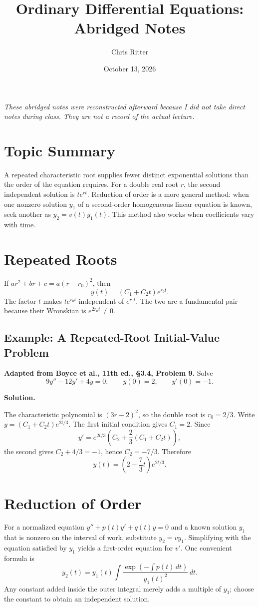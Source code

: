 \documentclass[11pt]{article}
\title{Ordinary Differential Equations: Abridged Notes}
\author{Chris Ritter}
\date{October 13, 2026}
\newenvironment{solution}
    {\par\noindent\textbf{Solution.}\par}
    {\par}
\begin{document}
\maketitle
\begin{center}
\small\emph{These abridged notes were reconstructed afterward because I did not take
direct notes during class. They are not a record of the actual lecture.}
\end{center}
\tableofcontents
\newpage

\section{Topic Summary}
A repeated characteristic root supplies fewer distinct exponential
solutions than the order of the equation requires. For a double real
root \(r\), the second independent solution is \(te^{rt}\).
Reduction of order is a more general method: when one nonzero
solution \(y_1\) of a second-order homogeneous linear equation is
known, seek another as \(y_2=v(t)y_1(t)\). This method also works
when coefficients vary with time.

\section{Repeated Roots}
If \(ar^2+br+c=a(r-r_0)^2\), then
\[
\boxed{y(t)=(C_1+C_2t)e^{r_0t}.}
\]
The factor \(t\) makes \(te^{r_0t}\) independent of
\(e^{r_0t}\). The two are a fundamental pair because their
Wronskian is \(e^{2r_0t}\ne0\).

\subsection{Example: A Repeated-Root Initial-Value Problem}
\textbf{Adapted from Boyce et al., 11th ed., \S3.4, Problem 9.}
Solve
\[
9y''-12y'+4y=0,\qquad y(0)=2,\qquad y'(0)=-1.
\]
\begin{solution}
The characteristic polynomial is \((3r-2)^2\), so the double root
is \(r_0=2/3\). Write \(y=(C_1+C_2t)e^{2t/3}\). The first initial
condition gives \(C_1=2\). Since
\[
y'=e^{2t/3}\left(C_2+\frac23(C_1+C_2t)\right),
\]
the second gives \(C_2+4/3=-1\), hence \(C_2=-7/3\). Therefore
\[
\boxed{y(t)=\left(2-\frac73t\right)e^{2t/3}.}
\]
\end{solution}

\section{Reduction of Order}
For a normalized equation \(y''+p(t)y'+q(t)y=0\) and a known
solution \(y_1\) that is nonzero on the interval of work, substitute
\(y_2=vy_1\). Simplifying with the equation satisfied by \(y_1\)
yields a first-order equation for \(v'\). One convenient formula is
\[
\boxed{y_2(t)=y_1(t)\int
\frac{\exp\left(-\int p(t)\,dt\right)}{y_1(t)^2}\,dt.}
\]
Any constant added inside the outer integral merely adds a multiple
of \(y_1\); choose the constant to obtain an independent solution.
\end{document}

